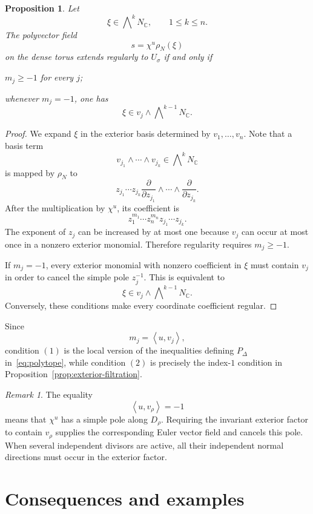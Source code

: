 \documentclass[colorlinks,11pt,reqno]{amsart}
\newtheorem{proposition}[theorem]{Proposition}
\theoremstyle{definition}
\theoremstyle{remark}
\newtheorem{remark}[theorem]{Remark}
\numberwithin{equation}{section}
\numberwithin{equation}{section}
\newcommand{\CC}{\mathbb{C}}
\newcommand{\Pair}[2]{\left\langle #1,#2\right\rangle}
\newcommand{\C}{\mathbb{C}}
\begin{document}
\begin{proposition}\label{prop:affine-regularity}
Let
\[
\xi\in\bigwedge\nolimits^kN_{\CC}, \qquad 1\leq k\leq n.
\]
The polyvector field
\[
s=\chi^u\rho_N(\xi)
\]
on the dense torus extends regularly to \(U_\sigma\) if and only if
\begin{compactenum}
\item \(m_j \geq -1\) for every \(j\);
\item whenever \(m_j=-1\), one has
\[
\xi \in v_j\wedge\bigwedge\nolimits^{k-1}N_{\CC}.
\]
\end{compactenum}
\end{proposition}
\begin{proof}
We expand \(\xi\) in the exterior basis determined by \(v_1,\dots,v_n\).
Note that a basis term
\[
v_{j_1}\wedge\cdots\wedge v_{j_k} \in \bigwedge\nolimits^k N_\C
\]
is mapped by $\rho_N$ to
\[
z_{j_1}\cdots z_{j_k} \frac{\partial}{\partial z_{j_1}} \wedge \cdots\wedge
\frac{\partial}{\partial z_{j_k}}.
\]
After the multiplication by \(\chi^u\), its coefficient is
\[
z_1^{m_1}\cdots z_n^{m_n} z_{j_1}\cdots z_{j_k}.
\]
The exponent of \(z_j\) can be increased by at most one because \(v_j\) can occur at most once in a nonzero exterior monomial. Therefore regularity requires \(m_j\geq-1\).

If \(m_j=-1\), every exterior monomial with nonzero coefficient in \(\xi\) must contain \(v_j\) in order to cancel the simple pole \(z_j^{-1}\). This is equivalent to
\[
\xi\in v_j\wedge\bigwedge\nolimits^{k-1}N_{\CC}.
\]
Conversely, these conditions make every coordinate coefficient regular.
\end{proof}

Since
\[
m_j=\Pair{u}{v_j},
\]
condition $(1)$ is the local version of the inequalities defining \(P_\Delta\)  in~\eqref{eq:polytope}, while condition $(2)$ is precisely the index-\(1\) condition in Proposition~\ref{prop:exterior-filtration}.

\begin{remark}
The equality
\[
\Pair{u}{v_\rho}=-1
\]
means that \(\chi^u\) has a simple pole along \(D_\rho\). Requiring the invariant exterior factor to contain \(v_\rho\) supplies the corresponding Euler vector field and cancels this pole. When several
independent divisors are active, all their independent normal directions must occur in the exterior factor.
\end{remark}

\section{Consequences and examples}\label{sec:consequences}
\end{document}
